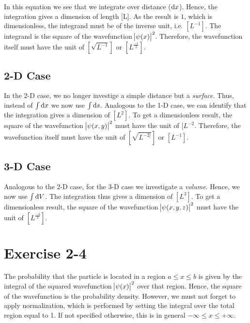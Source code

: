 In this equation we see that we integrate over distance ($\dif x$). Hence,
the integration gives a dimension of length [L]. As the result is $1$,
which is dimensionless, the integrand must be of the inverse
unit, i.e. $[L^{-1}]$. The integrand is the square of the wavefunction
$\abs{\psi(x)}^2$. Therefore, the wavefunction itself must have the unit of
$[\sqrt{L^{-1}}]$ or $[L^{\frac{-1}{2}}]$.

\subsection{2-D Case}
In the 2-D case, we no longer investige a simple distance but a \emph{surface}.
Thus, instead of $\int \dif x$ we now use $\int \dif s$. Analogous to the
1-D case, we can identify that the integration gives a dimension of $[L^2]$.
To get a dimensionless result, the square of the wavefunction
$\abs{\psi(x,y)}^2$ must have the unit of $[L^{-2}$. Therefore, the
wavefunction itself must have the unit of $[\sqrt{L^{-2]}}]$ or $[L^{-1}]$.

\subsection{3-D Case}
Analogous to the 2-D case, for the 3-D case we investigate a \emph{volume}.
Hence, we now use $\int \dif V$. The integration thus gives a dimension of
$[L^3]$. To get a dimensionless result, the square of the wavefunction
$\abs{\psi(x,y,z)}^2$ must have the unit of $[L^{\frac{-3}{2}}]$.


\newpage
\section{Exercise 2-4}
The probability that the particle is located in a region $a \leq x \leq b$ is
given by the integral of the squared wavefunction $\abs{\psi(x)}^2$ over that
region. Hence, the square of the wavefunction is the probability density.
However, we must not forget to apply normalization, which is performed by
setting the integral over the total region equal to 1. If not specified
otherwise, this is in general $-\infty \leq x \leq +\infty$.


